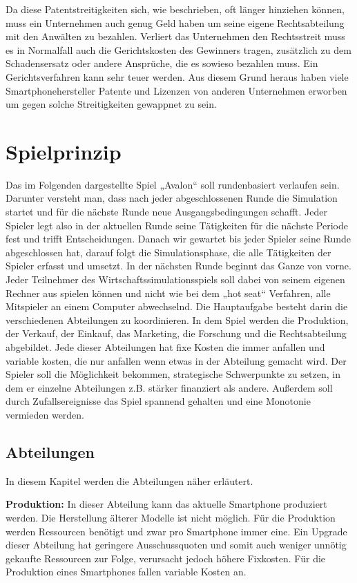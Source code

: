 Da diese Patentstreitigkeiten sich, wie beschrieben, oft länger hinziehen können, muss ein Unternehmen auch genug Geld haben um seine eigene Rechtsabteilung mit den Anwälten zu bezahlen. Verliert das Unternehmen den Rechtsstreit muss es in Normalfall auch die Gerichtskosten des Gewinners tragen, zusätzlich zu dem Schadensersatz oder andere Ansprüche, die es sowieso bezahlen muss. Ein Gerichtsverfahren kann sehr teuer werden. Aus diesem Grund heraus haben viele Smartphonehersteller Patente und Lizenzen von anderen Unternehmen erworben um gegen solche Streitigkeiten gewappnet zu sein.

\section{Spielprinzip}
Das im Folgenden dargestellte Spiel „Avalon“ soll rundenbasiert verlaufen sein. Darunter versteht man, dass nach jeder abgeschlossenen Runde die Simulation startet und für die nächste Runde neue Ausgangsbedingungen schafft. Jeder Spieler legt also in der aktuellen Runde seine Tätigkeiten für die nächste Periode fest und trifft Entscheidungen. Danach wir gewartet bis jeder Spieler seine Runde abgeschlossen hat, darauf folgt die Simulationsphase, die alle Tätigkeiten der Spieler erfasst und umsetzt. In der nächsten Runde beginnt das Ganze von vorne. Jeder Teilnehmer des Wirtschaftssimulationsspiels soll dabei von seinem eigenen Rechner aus spielen können und nicht wie bei dem „hot seat“ Verfahren, alle Mitspieler an einem Computer abwechselnd. Die Hauptaufgabe besteht darin die verschiedenen Abteilungen zu koordinieren. In dem Spiel werden die Produktion, der Verkauf, der Einkauf, das Marketing, die Forschung und die Rechtsabteilung abgebildet. Jede dieser Abteilungen hat fixe Kosten die immer anfallen und variable kosten, die nur anfallen wenn etwas in der Abteilung gemacht wird. Der Spieler soll die Möglichkeit bekommen, strategische Schwerpunkte zu setzen, in dem er einzelne Abteilungen z.B. stärker finanziert als andere. Außerdem soll durch Zufallsereignisse das Spiel spannend gehalten und eine Monotonie vermieden werden.

\subsection{Abteilungen}
In diesem Kapitel werden  die Abteilungen näher erläutert.

\textbf{Produktion: }
In dieser Abteilung kann das aktuelle Smartphone produziert werden. Die Herstellung älterer Modelle ist nicht möglich. Für die Produktion  werden Ressourcen benötigt und zwar pro Smartphone immer eine. Ein Upgrade dieser Abteilung hat geringere Ausschussquoten  und somit auch weniger unnötig gekaufte Ressourcen zur Folge, verursacht jedoch höhere Fixkosten. Für die Produktion eines Smartphones fallen variable Kosten an.

